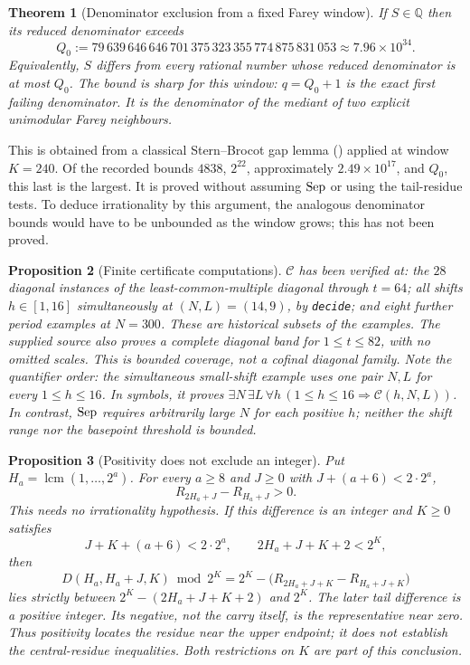 \documentclass[11pt]{article}
\theoremstyle{plain}
\newtheorem{thm}{Theorem}[section]
\newtheorem{prop}[thm]{Proposition}
\theoremstyle{definition}
\theoremstyle{remark}
\newcommand{\lean}[2]{\leanlink{#2}}
\let\origmathrm\mathrm
\renewcommand{\mathrm}[1]{\ifmmode\origmathrm{#1}\else\textrm{#1}\fi}%
\newcommand{\Q}{\mathbb{Q}}
\begin{document}
\begin{thm}[Denominator exclusion from a fixed Farey window]
\label{thm:denom}
If $S \in \Q$ then its reduced denominator exceeds
\[
Q_0 := 79\,639\,646\,646\,701\,375\,323\,355\,774\,875\,831\,053 \approx 7.96 \times 10^{34}.
\]
Equivalently, $S$ differs from every rational number whose reduced
denominator is at most $Q_0$.
The bound is sharp for this window: $q = Q_0 + 1$ is the exact first failing
denominator. It is the denominator of the mediant of two explicit
unimodular Farey neighbours.
\end{thm}

This is obtained from a classical Stern--Brocot gap lemma
(\lean{farey\_gap}{GapFareyBound.lean:51}) applied at window $K = 240$.
Of the recorded bounds $4838$, $2^{22}$, approximately
$2.49\times10^{17}$, and $Q_0$, this last is the largest. It is
proved without assuming $\mathrm{Sep}$ or using the tail-residue tests.
To deduce irrationality by this argument, the analogous denominator bounds
would have to be unbounded as the window grows; this has not been proved.

\begin{prop}[Finite certificate computations]
\label{prop:deposits}
$\mathcal{C}$ has been verified at: the $28$ diagonal instances of
the least-common-multiple diagonal through $t = 64$;
all shifts $h \in [1,16]$ simultaneously at $(N,L) = (14,9)$, by
\texttt{decide};
and eight further period examples at $N = 300$. These are historical
subsets of the examples. The supplied source also proves a complete diagonal band for
$1\le t\le82$, with no omitted scales.
This is bounded coverage, not a cofinal diagonal family.
Note the quantifier order: the simultaneous small-shift example
uses one pair $N,L$ for every $1\le h\le16$. In symbols, it proves
$\exists N\,\exists L\,\forall h\,(1\le h\le16\Rightarrow\mathcal C(h,N,L))$.
In contrast, $\mathrm{Sep}$ requires arbitrarily large $N$ for each
positive $h$; neither the shift range nor the basepoint threshold is bounded.
\end{prop}

\begin{prop}[Positivity does not exclude an integer]
\label{prop:sign}
Put $H_a=\operatorname{lcm}(1,\ldots,2^a)$. For every $a\ge8$ and
$J\ge0$ with $J+(a+6)<2\cdot2^a$,
\[
 R_{2H_a+J}-R_{H_a+J}>0.
\]
This needs no irrationality hypothesis.
If this difference is an integer and $K\ge0$ satisfies
\[
 J+K+(a+6)<2\cdot2^a,\qquad 2H_a+J+K+2<2^K,
\]
then
\[
 D(H_a,H_a+J,K)\bmod2^K
   =2^K-\bigl(R_{2H_a+J+K}-R_{H_a+J+K}\bigr)
\]
lies strictly between $2^K-(2H_a+J+K+2)$ and $2^K$. The later tail difference is a positive integer.
Its negative, not the carry itself, is the representative near zero.
Thus positivity locates the residue near the upper endpoint; it does not
establish the central-residue inequalities. Both restrictions on $K$ are
part of this conclusion.
\end{prop}
\end{document}
